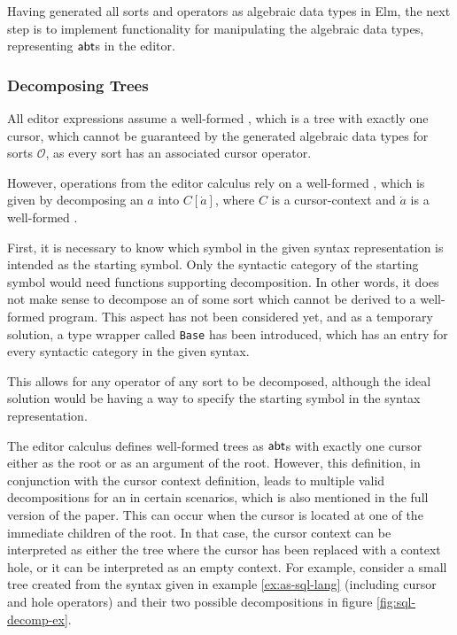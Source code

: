 \documentclass[sigplan,screen]{acmart}
\begin{document}
Having generated all sorts and operators as algebraic data types in Elm,
the next step is to implement functionality for manipulating the algebraic
data types, representing $\textsf{abt}$s in the editor.

\subsubsection{Decomposing Trees}

All editor expressions assume a well-formed \abt, which is a tree
with exactly one cursor, which cannot be guaranteed by the generated
algebraic data types for sorts $\mathcal{O}$, as every sort has an associated cursor operator.

However, operations from the editor calculus rely on a well-formed \abt, which is given
by decomposing an \abt $a$ into $C[\dot{a}]$, where $C$ is a
cursor-context and $\dot{a}$ is a
well-formed \abt.

First, it is necessary to know which symbol in the given syntax representation
is intended as the starting symbol. Only the syntactic category of the starting symbol
would need functions supporting decomposition.
In other words, it does not make sense to decompose an \abt of some sort which
cannot be derived to a well-formed program.
This aspect has not been considered yet, and as a temporary solution,
a type wrapper called \texttt{Base} has been introduced, which has an entry for
every syntactic category in the given syntax.


This allows for any operator
of any sort to be decomposed, although the ideal solution would be having
a way to specify the starting symbol in the syntax representation.

The editor calculus defines well-formed trees as $\textsf{abt}$s
with exactly one cursor either as the root or as an argument of the root.
However, this definition, in conjunction with the cursor context definition,
leads to multiple valid decompositions for an \abt in certain scenarios,
which is also mentioned in the full version of the paper. This can occur when the cursor is located
at one of the immediate children of the root. In that case, the cursor context
can be interpreted as either the tree where the cursor has been replaced with a
context hole, or it can be interpreted as an empty context.
For example, consider a small tree created from the syntax given in
example \cref{ex:as-sql-lang} (including cursor and hole operators) and
their two possible decompositions in figure \cref{fig:sql-decomp-ex}.
\end{document}
